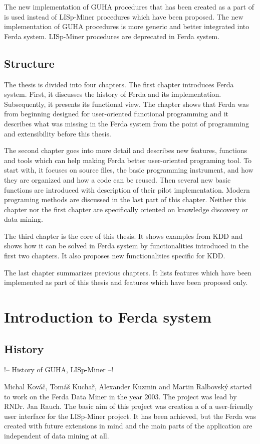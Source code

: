 \documentclass[a4paper,12pt]{book}
\begin{document}
The new implementation of GUHA procedures that has been created as a part of \cite[diploma thesis of Tomáš Kuchař]{thesisKuchar} is used instead of LISp-Miner procedures which have been proposed. The new implementation of GUHA procedures is more generic and better integrated into Ferda system. LISp-Miner procedures are deprecated in Ferda system.

\section*{Structure}
The thesis is divided into four chapters. The first chapter introduces Ferda system. First, it discusses the history of Ferda and its implementation. Subsequently, it presents its functional view. The chapter shows that Ferda was from beginning designed for user-oriented functional programming and it describes what was missing in the Ferda system from the point of programming and extensibility before this thesis.

The second chapter goes into more detail and describes new features, functions and tools which can help making Ferda better user-oriented programing tool. To start with, it focuses on source files, the basic programming instrument, and how they are organized and how a code can be reused. Then several new basic functions are introduced with description of their pilot implementation. Modern programing methods are discussed in the last part of this chapter. Neither this chapter nor the first chapter are specifically oriented on knowledge discovery or data mining.

The third chapter is the core of this thesis. It shows examples from KDD and shows how it can be solved in Ferda system by functionalities introduced in the first two chapters. It also proposes new functionalities specific for KDD.

The last chapter summarizes previous chapters. It lists features which have been implemented as part of this thesis and features which have been proposed only.

\chapter{Introduction to Ferda system}
\section{History}
!-- History of GUHA, LISp-Miner --!

Michal Kováč, Tomáš Kuchař, Alexander Kuzmin and Martin Ralbovský started to work on the Ferda Data Miner in the year 2003. The project was lead by RNDr. Jan Rauch. The basic aim of this project was creation a of a user-friendly user interface for the LISp-Miner project. It has been achieved, but the Ferda was created with future extensions in mind and the main parts of the application are independent of data mining at all.
\end{document}
